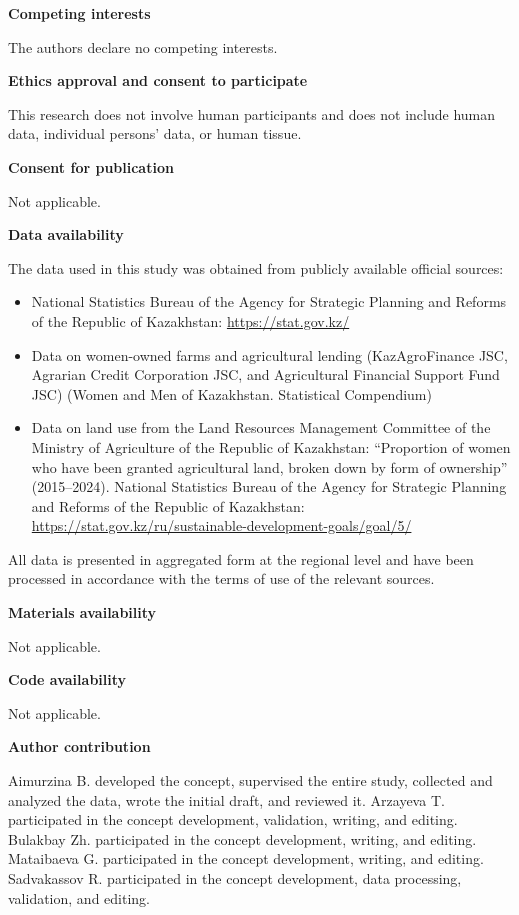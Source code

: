 \documentclass[pdflatex,sn-mathphys-ay]{sn-jnl}
\begin{document}
\medskip
\noindent\textbf{Competing interests}

The authors declare no competing interests.

\medskip
\noindent\textbf{Ethics approval and consent to participate}

This research does not involve human participants and does not include
human data, individual persons' data, or human tissue.

\medskip
\noindent\textbf{Consent for publication}

Not applicable.

\medskip
\noindent\textbf{Data availability}

The data used in this study was obtained from publicly available
official sources:

\begin{itemize}
\item National Statistics Bureau of the Agency for Strategic Planning
and Reforms of the Republic of Kazakhstan: \url{https://stat.gov.kz/}
\item Data on women-owned farms and agricultural lending
(KazAgroFinance JSC, Agrarian Credit Corporation JSC, and Agricultural
Financial Support Fund JSC) (Women and Men of Kazakhstan. Statistical
Compendium)
\item Data on land use from the Land Resources Management Committee of
the Ministry of Agriculture of the Republic of Kazakhstan: ``Proportion
of women who have been granted agricultural land, broken down by form of
ownership'' (2015--2024). National Statistics Bureau of the Agency for
Strategic Planning and Reforms of the Republic of Kazakhstan:
\url{https://stat.gov.kz/ru/sustainable-development-goals/goal/5/}
\end{itemize}

All data is presented in aggregated form at the regional level and have
been processed in accordance with the terms of use of the relevant
sources.

\medskip
\noindent\textbf{Materials availability}

Not applicable.

\medskip
\noindent\textbf{Code availability}

Not applicable.

\medskip
\noindent\textbf{Author contribution}

Aimurzina B. developed the concept, supervised the entire study,
collected and analyzed the data, wrote the initial draft, and reviewed
it. Arzayeva T. participated in the concept development, validation,
writing, and editing. Bulakbay Zh. participated in the concept
development, writing, and editing. Mataibaeva G. participated in the
concept development, writing, and editing. Sadvakassov R. participated
in the concept development, data processing, validation, and editing.


\end{document}
